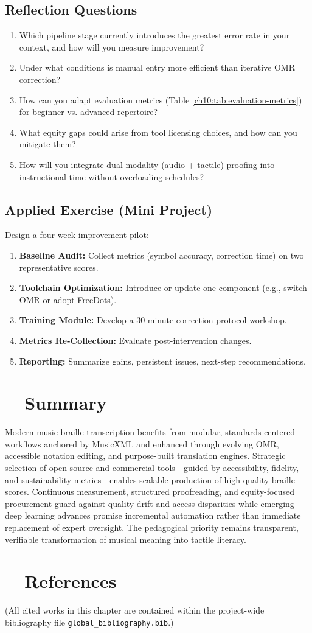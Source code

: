 \subsection*{Reflection Questions}
\begin{enumerate}
	\item Which pipeline stage currently introduces the greatest error rate in your context, and how will you measure improvement?
	\item Under what conditions is manual entry more efficient than iterative \gls{OMR} correction?
	\item How can you adapt evaluation metrics (Table \ref{ch10:tab:evaluation-metrics}) for beginner vs. advanced repertoire?
	\item What equity gaps could arise from tool licensing choices, and how can you mitigate them?
	\item How will you integrate dual-modality (audio + tactile) proofing into instructional time without overloading schedules?
\end{enumerate}

\subsection*{Applied Exercise (Mini Project)}
Design a four-week improvement pilot:
\begin{enumerate}
	\item \textbf{Baseline Audit:} Collect metrics (symbol accuracy, correction time) on two representative scores.
	\item \textbf{Toolchain Optimization:} Introduce or update one component (e.g., switch OMR or adopt FreeDots).
	\item \textbf{Training Module:} Develop a 30-minute correction protocol workshop.
	\item \textbf{Metrics Re-Collection:} Evaluate post-intervention changes.
	\item \textbf{Reporting:} Summarize gains, persistent issues, next-step recommendations.
\end{enumerate}

\section{~~Summary}\label{ch10:sec:summary}
Modern music braille transcription benefits from modular, standards-centered workflows anchored by \gls{MusicXML} and enhanced through evolving \gls{OMR}, accessible notation editing, and purpose-built translation engines.\supercite{daisy-musicxml, dancingdots-goodfeel, DuxburyDBT} Strategic selection of open-source and commercial tools—guided by accessibility, fidelity, and sustainability metrics—enables scalable production of high-quality braille scores. Continuous measurement, structured proofreading, and equity-focused procurement guard against quality drift and access disparities while emerging deep learning advances promise incremental automation rather than immediate replacement of expert oversight. The pedagogical priority remains transparent, verifiable transformation of musical meaning into tactile literacy.

\section{~~References}\label{ch10:sec:references}
\noindent (All cited works in this chapter are contained within the project-wide bibliography file \texttt{global\_bibliography.bib}.)

